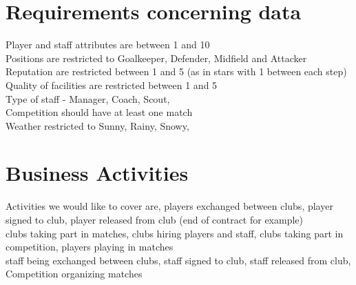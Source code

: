 \documentclass{report}
\begin{document}
\section{Requirements concerning data}
Player and staff attributes are between 1 and 10 \\ 
Positions are restricted to Goalkeeper, Defender, Midfield and Attacker \\ 
Reputation are restricted between 1 and 5 (as in stars with 1 between each step) \\
Quality of facilities are restricted between 1 and 5 \\ 
Type of staff - Manager, Coach, Scout, \\ 
Competition should have at least one match \\ 
Weather restricted to Sunny, Rainy, Snowy, \\ 

\section{Business Activities}
Activities we would like to cover are, players exchanged between clubs, player signed to club, player released from club (end of contract for example)
\\
clubs taking part in matches, clubs hiring players and staff, clubs taking part in competition, 
players playing in matches \\
staff being exchanged between clubs, staff signed to club, staff released from club, \\ 
Competition organizing matches
\end{document}

